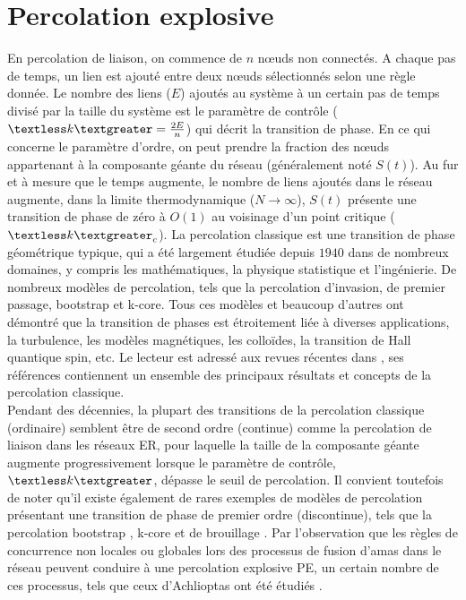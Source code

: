 \section{Percolation explosive}
En percolation de liaison, on commence de $n$ nœuds non connectés. A chaque pas de temps, un lien est ajouté entre deux nœuds sélectionnés selon une règle donnée. Le nombre des liens ($E$) ajoutés au système à un certain pas de temps divisé par la taille du système est le paramètre de contrôle ($\km=\frac{2E}{n}$) qui décrit la transition de phase. En ce qui concerne le paramètre d'ordre, on peut prendre la fraction des nœuds appartenant à la composante géante du réseau (généralement noté $S(t)$). Au fur et à mesure que le temps augmente, le nombre de liens ajoutés dans le réseau augmente, dans la limite thermodynamique ($N\longrightarrow \infty$), $S(t)$ présente une transition de phase de zéro à $O(1)$ au voisinage d'un point critique ($\km_c$). La percolation classique est une transition de phase géométrique typique, qui a été largement étudiée depuis $1940$ dans de nombreux domaines, y compris les mathématiques, la physique statistique et l'ingénierie. De nombreux modèles de percolation, tels que la percolation d'invasion, de premier passage,  bootstrap et k-core. 
Tous ces modèles et beaucoup d'autres ont démontré que la transition de phases est étroitement liée à diverses applications, la turbulence, les modèles magnétiques, les colloïdes, la transition de Hall quantique spin, etc. Le lecteur est adressé aux revues récentes dans \cite{Boccaletti-al2016,Souza-Nagler2015,Araujo-al2014}, ses références contiennent un ensemble des principaux résultats et concepts de la percolation classique.\\

Pendant des décennies, la plupart des transitions de la percolation classique (ordinaire) semblent être de second ordre (continue) comme la percolation de liaison dans les réseaux ER, pour laquelle la taille de la composante géante augmente progressivement lorsque le paramètre de contrôle, $\km$, dépasse le seuil de percolation. Il convient toutefois de noter qu'il existe également de rares exemples de modèles de percolation présentant une transition de phase de premier ordre (discontinue), tels que la percolation bootstrap \cite{Adler1991}, k-core \cite{Dorogovtsev2-2006} et de brouillage \cite{Echenique-al2005}. Par l'observation que les règles de concurrence non locales ou globales lors des processus de fusion d'amas dans le réseau peuvent conduire à une percolation explosive PE, un certain nombre de ces processus, tels que ceux d'Achlioptas ont été étudiés \cite{Costa-al2010,Costa-al2015,Cho-Kahng2011}.
